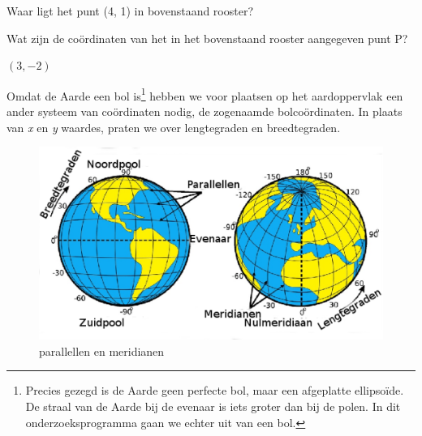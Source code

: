 \begin{opgave}
	\begin{subopgave}
		Waar ligt het punt (4, 1) in bovenstaand rooster?
		\begin{antwoord}		
		\end{antwoord}
	\end{subopgave}
	\begin{subopgave}
		Wat zijn de co\"ordinaten van het in het bovenstaand rooster aangegeven punt P?
		\begin{antwoord}
			$(3, -2)$
		\end{antwoord}
	\end{subopgave}
\end{opgave}

Omdat de Aarde een bol is\footnote{Precies gezegd is de Aarde geen perfecte bol, maar een afgeplatte ellipso\"ide. De straal van de Aarde bij de evenaar is iets groter dan bij de polen. In dit onderzoeksprogramma gaan we echter uit van een bol.} hebben we voor plaatsen op het aardoppervlak een ander systeem van co\"ordinaten nodig, de zogenaamde bolco\"ordinaten. In plaats van \textit{x} en \textit{y} waardes, praten we over lengtegraden en breedtegraden.

\begin{figure}[h]
	\centering
	\includegraphics[width=15cm]{Parallels-and-Meridians-nl.eps}
	\caption{parallellen en meridianen}
	\label{fig_par_mer}
\end{figure}

